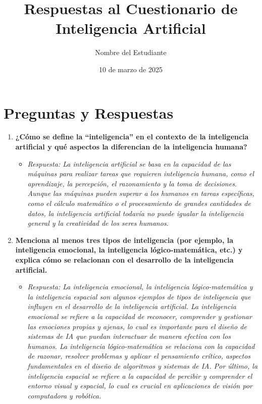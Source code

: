 \documentclass[12pt]{article}
\title{Respuestas al Cuestionario de Inteligencia Artificial}
\author{Nombre del Estudiante}
\date{10 de marzo de 2025}
\begin{document}
\maketitle

\section*{Preguntas y Respuestas}

\begin{enumerate}
    \item \textbf{¿Cómo se define la “inteligencia” en el contexto de la inteligencia artificial y qué aspectos la diferencian de la inteligencia humana?}
    \begin{itemize}
        \item \textit{Respuesta: La inteligencia artificial se basa en la capacidad de las máquinas para realizar tareas que requieren inteligencia humana, como el aprendizaje, la percepción, el razonamiento y la toma de decisiones. Aunque las máquinas pueden superar a los humanos en tareas específicas, como el cálculo matemático o el procesamiento de grandes cantidades de datos, la inteligencia artificial todavía no puede igualar la inteligencia general y la creatividad de los seres humanos.} 
    \end{itemize}

    \item \textbf{Menciona al menos tres tipos de inteligencia (por ejemplo, la inteligencia emocional, la inteligencia lógico-matemática, etc.) y explica cómo se relacionan con el desarrollo de la inteligencia artificial.}
    \begin{itemize}
        \item \textit{Respuesta: La inteligencia emocional, la inteligencia lógico-matemática y la inteligencia espacial son algunos ejemplos de tipos de inteligencia que influyen en el desarrollo de la inteligencia artificial. La inteligencia emocional se refiere a la capacidad de reconocer, comprender y gestionar las emociones propias y ajenas, lo cual es importante para el diseño de sistemas de IA que puedan interactuar de manera efectiva con los humanos. La inteligencia lógico-matemática se relaciona con la capacidad de razonar, resolver problemas y aplicar el pensamiento crítico, aspectos fundamentales en el diseño de algoritmos y sistemas de IA. Por último, la inteligencia espacial se refiere a la capacidad de percibir y comprender el entorno visual y espacial, lo cual es crucial en aplicaciones de visión por computadora y robótica.} 
    \end{itemize}


\end{enumerate}
\end{document}
